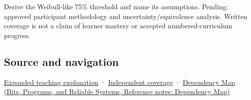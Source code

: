 Derive the Weibull-like 75\% threshold and name its assumptions. Pending: approved participant methodology and uncertainty/equivalence analysis. Written coverage is not a claim of learner mastery or accepted numbered-curriculum progress.

\subsection{Source and navigation}\label{appendix-1759f03e8ce7-source-and-navigation}

\hyperref[04-visual-computing-ii-ch042-a-threshold-is-evidence-from-a-procedure-not-a-universal-border]{Expanded teaching explanation} · \hyperref[appendix-fd090d982a15-xr01---independent-seeing-and-representation-source]{Independent coverage} · \href{../01-Bits-Programs-and-Reliable-Systems/main.pdf\#nameddest=appendix-4ad47bdd269a}{Dependency Map (Bits, Programs, and Reliable Systems, Reference notes: Dependency Map)}
